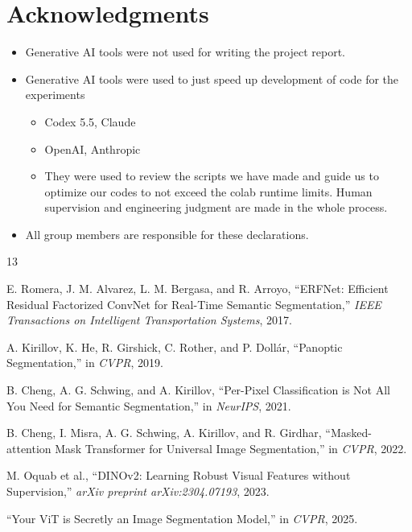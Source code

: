 \documentclass[10pt,twocolumn,letterpaper]{article}
\begin{document}
\section{Acknowledgments}
\begin{itemize}
    \item Generative AI tools were not used for writing the project report.
    \item Generative AI tools were used to just speed up development of code for the experiments
    \begin{itemize}
        \item Codex 5.5, Claude
        \item OpenAI, Anthropic
        \item They were used to review the scripts we have made and guide us to optimize our codes to not exceed the colab runtime limits.
        Human supervision and engineering judgment are made in the whole process.
        
    \end{itemize}
    \item All group members are responsible for these declarations.
\end{itemize}

{\small
\begin{thebibliography}{13}

E. Romera, J. M. Alvarez, L. M. Bergasa, and R. Arroyo,
``ERFNet: Efficient Residual Factorized ConvNet for Real-Time Semantic Segmentation,''
\emph{IEEE Transactions on Intelligent Transportation Systems}, 2017.

A. Kirillov, K. He, R. Girshick, C. Rother, and P. Dollár,
``Panoptic Segmentation,''
in \emph{CVPR}, 2019.

B. Cheng, A. G. Schwing, and A. Kirillov,
``Per-Pixel Classification is Not All You Need for Semantic Segmentation,''
in \emph{NeurIPS}, 2021.

B. Cheng, I. Misra, A. G. Schwing, A. Kirillov, and R. Girdhar,
``Masked-attention Mask Transformer for Universal Image Segmentation,''
in \emph{CVPR}, 2022.

M. Oquab et al.,
``DINOv2: Learning Robust Visual Features without Supervision,''
\emph{arXiv preprint arXiv:2304.07193}, 2023.

``Your ViT is Secretly an Image Segmentation Model,''
in \emph{CVPR}, 2025.

\end{thebibliography}
}
\end{document}
